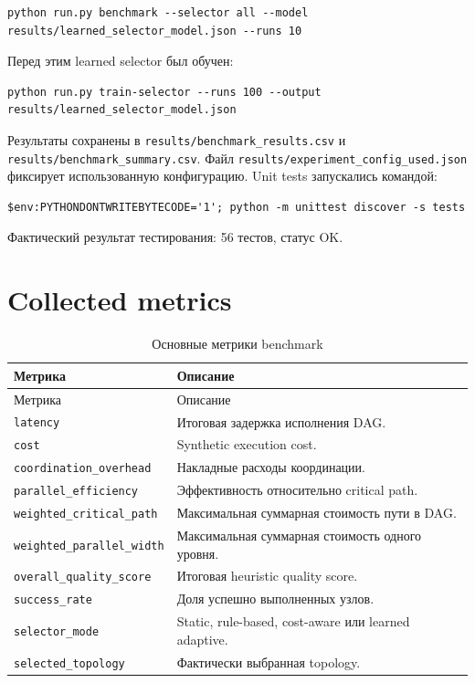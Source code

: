 \documentclass[12pt,a4paper]{report}
\newcommand{\code}[1]{\texttt{#1}}
\begin{document}
\begin{lstlisting}
python run.py benchmark --selector all --model results/learned_selector_model.json --runs 10
\end{lstlisting}

Перед этим learned selector был обучен:

\begin{lstlisting}
python run.py train-selector --runs 100 --output results/learned_selector_model.json
\end{lstlisting}

Результаты сохранены в \code{results/benchmark\_results.csv} и \code{results/benchmark\_summary.csv}. Файл \code{results/experiment\_config\_used.json} фиксирует использованную конфигурацию. Unit tests запускались командой:

\begin{lstlisting}
$env:PYTHONDONTWRITEBYTECODE='1'; python -m unittest discover -s tests
\end{lstlisting}

Фактический результат тестирования: 56 тестов, статус OK.

\section{Collected metrics}

\begin{longtable}{p{}p{}}
\caption{Основные метрики benchmark}\\
\toprule
Метрика & Описание \\
\midrule
\endfirsthead
\toprule
Метрика & Описание \\
\midrule
\endhead
\code{latency} & Итоговая задержка исполнения DAG. \\
\code{cost} & Synthetic execution cost. \\
\code{coordination\_overhead} & Накладные расходы координации. \\
\code{parallel\_efficiency} & Эффективность относительно critical path. \\
\code{weighted\_critical\_path} & Максимальная суммарная стоимость пути в DAG. \\
\code{weighted\_parallel\_width} & Максимальная суммарная стоимость одного уровня. \\
\code{overall\_quality\_score} & Итоговая heuristic quality score. \\
\code{success\_rate} & Доля успешно выполненных узлов. \\
\code{selector\_mode} & Static, rule-based, cost-aware или learned adaptive. \\
\code{selected\_topology} & Фактически выбранная topology. \\
\bottomrule
\end{longtable}
\end{document}
